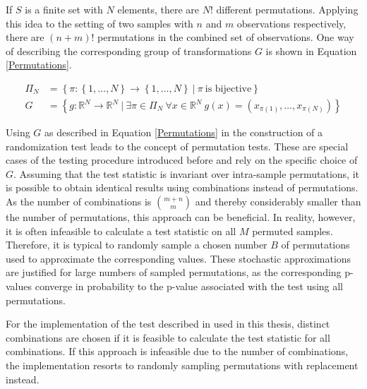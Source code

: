 \documentclass[12pt, a4paper]{article}
\theoremstyle{MAstyle} \newtheorem{assumption}{Assumption}[section]
\theoremstyle{MAstyle} \newtheorem{definition}{Definition}[section]
\theoremstyle{MAstyle} \newtheorem{theorem}{Theorem}[section]
\begin{document}
			If $S$ is a finite set with $N$ elements, there are $N!$ different permutations. Applying this idea to the setting of two samples with $n$ and $m$ observations respectively, there are $(n+m)!$ permutations in the combined set of observations. One way of describing the corresponding group of transformations $G$ is shown in Equation \ref{Permutations}.
			
			\begin{equation}\label{Permutations}
				\begin{split}
					\Pi_N &= \left\{\pi: \left\{1, \dots, N \right\} \rightarrow \left\{1, \dots, N \right\} \ \vert \ \pi \ \text{is bijective} \right\} \\
					G &= \left\{g:\mathbb{R}^N \rightarrow \mathbb{R}^N \ \vert \ \exists \pi \in \Pi_N \ \forall x \in \mathbb{R}^N \ g(x) = \left(x_{\pi(1)}, \dots, x_{\pi(N)}\right) \right\}
				\end{split}
			\end{equation}
			
			Using $G$ as described in Equation \ref{Permutations} in the construction of a randomization test leads to the concept of permutation tests. These are special cases of the testing procedure introduced before and rely on the specific choice of $G$. Assuming that the test statistic is invariant over intra-sample permutations, it is possible to obtain identical results using combinations instead of permutations. As the number of combinations is $\binom{m+n}{m}$ and thereby considerably smaller than the number of permutations, this approach can be beneficial.			
			In reality, however, it is often infeasible to calculate a test statistic on all $M$ permuted samples. Therefore, it is typical to randomly sample a chosen number $B$ of permutations used to approximate the corresponding values. These stochastic approximations are justified for large numbers of sampled permutations, as the corresponding p-values converge in probability to the p-value associated with the test using all permutations. 
			
			For the implementation of the test described in \cite{bugni_permutation_2021} used in this thesis, distinct combinations are chosen if it is feasible to calculate the test statistic for all combinations. If this approach is infeasible due to the number of combinations, the implementation resorts to randomly sampling permutations with replacement instead.
		
\end{document}
